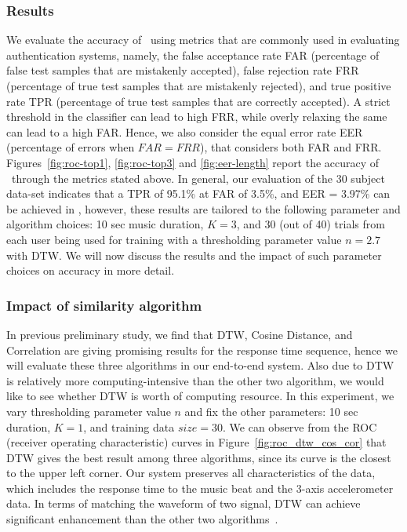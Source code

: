 \subsubsection{Results}
We evaluate the accuracy of \systemname~using metrics that are commonly used 
in evaluating authentication systems, namely,
the false acceptance rate FAR (percentage of false test samples that are 
mistakenly accepted), false rejection rate FRR (percentage of true test 
samples that are mistakenly rejected), and true positive rate 
TPR (percentage of true test samples that are correctly accepted). 
A strict threshold in the classifier can lead to high FRR, while 
overly relaxing the same can lead to a high FAR. Hence, we also consider 
the equal error rate EER (percentage of errors when $FAR = FRR$), that 
considers both FAR and FRR.
Figures~\ref{fig:roc-top1}, \ref{fig:roc-top3} and \ref{fig:eer-length} report 
the accuracy 
of \systemname~through the metrics stated above. 
In general, our evaluation of the 30 subject data-set indicates that a 
TPR of 95.1\% at FAR of 3.5\%, and EER = 3.97\% can be achieved in 
\systemname, however, these results are tailored to the following parameter 
and algorithm choices:
10 sec music duration, $K = 3$, and 30 (out of 40) trials from each user being 
used for training with a thresholding parameter value $n = 2.7$ with DTW. 
We will now discuss the results and the impact of such parameter choices 
on accuracy in more detail.
\subsubsection{Impact of similarity algorithm}
In previous preliminary study, we find that DTW, Cosine Distance, and Correlation are giving promising results for the response time sequence, hence we will evaluate these three algorithms in our end-to-end system. Also due to DTW is relatively more computing-intensive than the other two algorithm, we would like to see whether DTW  is worth of computing resource. In this experiment, we vary thresholding parameter value $n$ and fix the other parameters: 10 sec duration, $K = 1$, and  training data $size = 30$. We can observe from the ROC 
(receiver operating characteristic) curves in Figure~\ref{fig:roc_dtw_cos_cor} that DTW gives the best result among three algorithms, since its curve is the closest to the upper left corner. Our system preserves all characteristics of the data, which includes the response time to the music beat and the 3-axis accelerometer data. In terms of matching the waveform of two signal, DTW can achieve significant enhancement than the other two algorithms~\cite{DTW}. 
